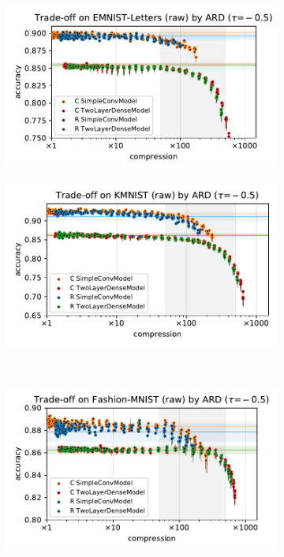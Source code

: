 \documentclass[a4paper,10pt,twocolumn]{article}
\begin{document}
\begin{figure}[b]
  \centering
  \begin{subfigure}[b]{0.5\columnwidth}
    \centering
    \includegraphics[width=\linewidth]{figure__mnist-like__trade-off/appendix__ARD__emnist_letters__raw__-0.5.pdf}
  \end{subfigure}%
  \begin{subfigure}[b]{0.5\columnwidth}
    \centering
    \includegraphics[width=\linewidth]{figure__mnist-like__trade-off/appendix__ARD__kmnist__raw__-0.5.pdf}
  \end{subfigure} \\%
  \begin{subfigure}[b]{0.5\columnwidth}
    \centering
    \includegraphics[width=\linewidth]{figure__mnist-like__trade-off/appendix__ARD__fashionmnist__raw__-0.5.pdf}

\end{subfigure}
\end{figure}
\end{document}

